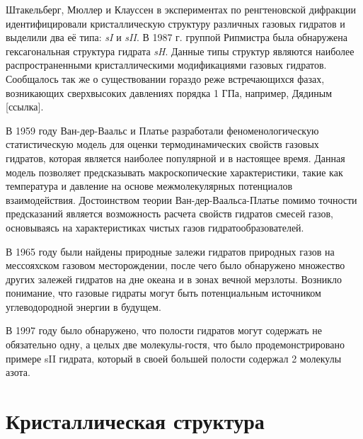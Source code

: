 \par Штакельберг, Мюллер и Клауссен в экспериментах по ренгтеновской дифракции идентифицировали кристаллическую структуру различных газовых гидратов и выделили два её типа: \textit{sI} и \textit{sII}. В 1987 г. группой Рипмистра была обнаружена гексагональная структура гидрата \textit{sH}. Данные типы структур являются наиболее распространенными кристаллическими модификациями газовых гидратов. Сообщалось так же о существовании гораздо реже встречающихся фазах, возникающих сверхвысоких давлениях порядка 1 ГПа, например, Дядиным [ссылка].

\par В 1959 году Ван-дер-Ваальс и Платье разработали  феноменологическую статистическую модель для оценки термодинамических свойств газовых гидратов, которая является наиболее популярной и в настоящее время. Данная модель позволяет предсказывать макроскопические характеристики, такие как температура и давление на основе межмолекулярных потенциалов взаимодействия. Достоинством теории Ван-дер-Ваальса-Платье помимо точности предсказаний является возможность расчета свойств гидратов смесей газов, основываясь на характеристиках чистых газов гидратообразователей.


\par В 1965 году были найдены природные залежи гидратов природных газов на мессояхском газовом месторождении, после чего было обнаружено множество других залежей гидратов на дне океана и в зонах вечной мерзлоты. Возникло понимание, что газовые гидраты могут быть потенциальным источником углеводородной энергии в будущем.
    
\par В 1997 году было обнаружено, что полости гидратов могут содержать не обязательно одну, а целых две молекулы-гостя, что было продемонстрировано примере sII гидрата, который в своей большей полости содержал 2 молекулы азота.

\section{Кристаллическая структура}

